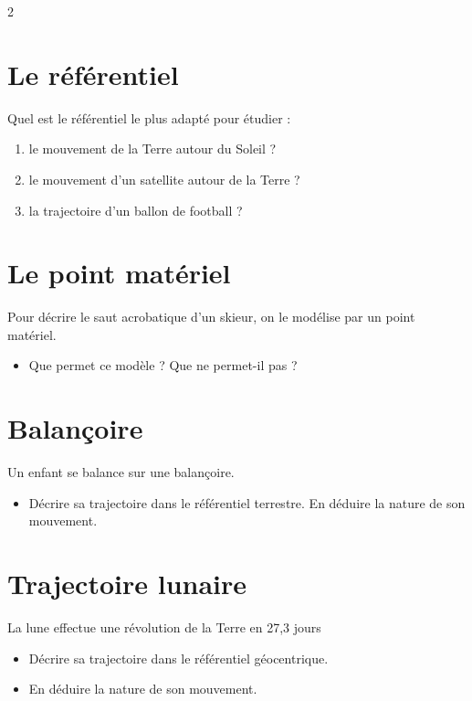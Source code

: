 \documentclass[a4paper,11pt,fleqn]{article}%
\begin{document}
\maketitle

\begin{multicols}{2}

\section{Le référentiel}
Quel est le référentiel le plus adapté pour étudier :
\begin{enumerate}
	\item le mouvement de la Terre autour du Soleil ?
	\item le mouvement d'un satellite autour de la Terre ?
	\item la trajectoire d'un ballon de football ?
\end{enumerate}

\section{Le point matériel}
Pour décrire le saut acrobatique d'un skieur, on le modélise par un point matériel.
\begin{itemize}
	\item Que permet ce modèle ? Que ne permet-il pas ?
\end{itemize}

\section{Balançoire}
Un enfant se balance sur une balançoire.
\begin{itemize}
	\item Décrire sa trajectoire dans le référentiel terrestre. En déduire la nature de son mouvement.
\end{itemize}

\section{Trajectoire lunaire}
La lune effectue une révolution de la Terre en 27,3 jours
\begin{itemize}
	\item Décrire sa trajectoire dans le référentiel géocentrique.
	\item En déduire la nature de son mouvement.
\end{itemize}


\end{multicols}
\end{document}
